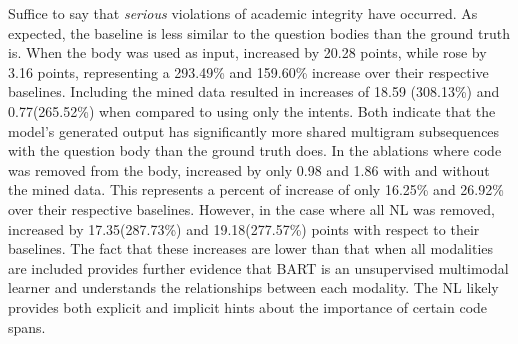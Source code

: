 \documentclass[11pt]{article}
\begin{document}
\indent Suffice to say that \textit{serious} violations of academic integrity have occurred. As expected, the baseline is less similar to the question bodies than the ground truth is. When the body was used as input,  increased by 20.28 points, while  rose by 3.16 points, representing a 293.49\% and 159.60\% increase over their respective baselines. Including the mined data resulted in increases of 18.59 (308.13\%) and 0.77(265.52\%) when compared to using only the intents. Both indicate that the model's generated output has significantly more shared multigram subsequences with the question body than the ground truth does. In the ablations where code was removed from the body,  increased by only 0.98 and 1.86 with and without the mined data. This represents a percent of increase of only 16.25\% and 26.92\% over their respective baselines. However, in the case where all NL was removed,  increased by 17.35(287.73\%) and 19.18(277.57\%) points with respect to their baselines. The fact that these increases are lower than that when all modalities are included provides further evidence that BART is an unsupervised multimodal learner and understands the relationships between each modality. The NL likely provides both explicit and implicit hints about the importance of certain code spans.
\end{document}
